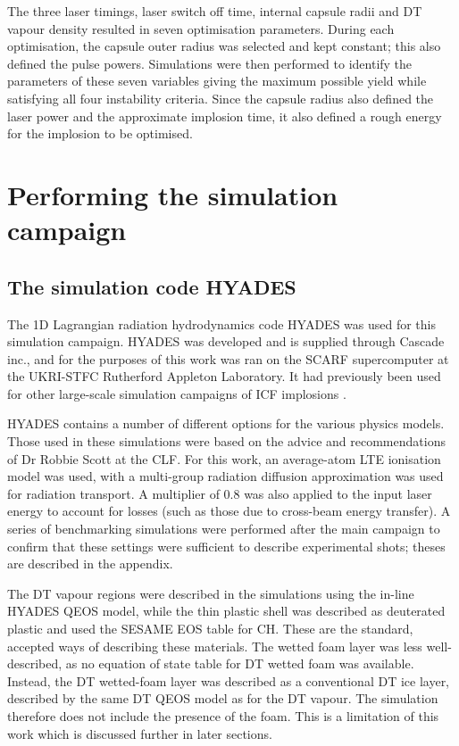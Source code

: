 The three laser timings, laser switch off time, internal capsule radii and DT vapour density resulted in seven optimisation parameters. During each optimisation, the capsule outer radius was selected and kept constant; this also defined the pulse powers. Simulations were then performed to identify the parameters of these seven variables giving the maximum possible yield while satisfying all four instability criteria. Since the capsule radius also defined the laser power and the approximate implosion time, it also defined a rough energy for the implosion to be optimised.


\section{Performing the simulation campaign}

\subsection{The simulation code HYADES}

The 1D Lagrangian radiation hydrodynamics code HYADES was used for this simulation campaign.  HYADES was developed and is supplied through Cascade inc., and for the purposes of this work was ran on the SCARF supercomputer at the UKRI-STFC Rutherford Appleton Laboratory. It had previously been used for other large-scale simulation campaigns of ICF implosions \cite{Hatfield2019}. 

HYADES contains a number of different options for the various physics models. Those used in these simulations were based on the advice and recommendations of Dr Robbie Scott at the CLF. For this work, an average-atom LTE ionisation model was used, with a multi-group radiation diffusion approximation was used for radiation transport. A multiplier of 0.8 was also applied to the input laser energy to account for losses (such as those due to cross-beam energy transfer). A series of benchmarking simulations were performed after the main campaign to confirm that these settings were sufficient to describe experimental shots; theses are described in the appendix.

The DT vapour regions were described in the simulations using the in-line HYADES QEOS model, while the thin plastic shell was described as deuterated plastic and used the SESAME EOS table for CH. These are the standard, accepted ways of describing these materials. The wetted foam layer was less well-described, as no equation of state table for DT wetted foam was available. Instead, the DT wetted-foam layer was described as a conventional DT ice layer, described by the same DT QEOS model as for the DT vapour. The simulation therefore does not include the presence of the foam. This is a limitation of this work which is discussed further in later sections.

